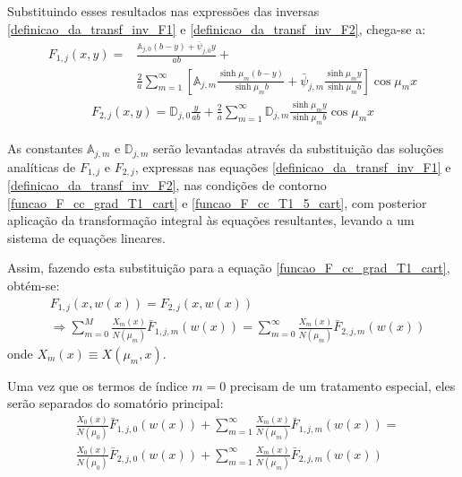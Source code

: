 Substituindo esses resultados
nas expressões das inversas \eqref{definicao_da_transf_inv_F1} e \eqref{definicao_da_transf_inv_F2}, chega-se a:
\begin{align}
F_{1, j}(x, y) = & \frac{\mathbb{A}_{j,0}(b - y) + \bar{\psi}_{j,0}y}{ab} + \nonumber \\
&\frac{2}{a}\sum_{m=1}^\infty\left[\mathbb{A}_{j,m}\frac{\sinh\mu_m (b - y)}{\sinh\mu_m b} + \bar{\psi}_{j, m}\frac{\sinh\mu_m y}{\sinh\mu_m b}\right]\cos\mu_m x
\label{solucao_transf_inversa_F1_com_dependencia}
\end{align}
\begin{align}
F_{2, j}(x, y) = \mathbb{D}_{j,0}\frac{y}{ab}  + \frac{2}{a}\sum_{m=1}^\infty\mathbb{D}_{j,m}\frac{\sinh\mu_m y}{\sinh\mu_m b} \cos\mu_m x
\label{solucao_transf_inversa_F2_com_dependencia}
\end{align}

As constantes $\mathbb{A}_{j,m}$ e $\mathbb{D}_{j,m}$ serão levantadas através da substituição das soluções analíticas de $F_{1,j}$ e $F_{2,j}$, expressas nas equações \eqref{definicao_da_transf_inv_F1} e
\eqref{definicao_da_transf_inv_F2}, nas condições de contorno \eqref{funcao_F_cc_grad_T1_cart} e \eqref{funcao_F_cc_T1_5_cart}, com posterior aplicação da transformação integral às equações resultantes, levando a um sistema de equações lineares.

Assim, fazendo esta
substituição para a equação \eqref{funcao_F_cc_grad_T1_cart}, obtém-se:
\begin{align}
	& F_{1,j}(x, w(x)) = F_{2, j}(x, w(x)) \nonumber \\
	& \Rightarrow \sum_{m=0}^M \frac{X_m(x)}{N(\mu_m)}\bar{F}_{1,j,m}(w(x)) = \sum_{m=0}^\infty \frac{X_m(x)}{N(\mu_m)}\bar{F}_{2,j,m}(w(x))
\end{align}
onde $X_m(x) \equiv X(\mu_m, x)$.

Uma vez que os termos de índice $m = 0$ precisam de um tratamento especial, eles serão separados do somatório principal:
\begin{align}
& \frac{X_0(x)}{N(\mu_0)}\bar{F}_{1,j,0}(w(x)) +
\sum_{m=1}^\infty \frac{X_m(x)}{N(\mu_m)}\bar{F}_{1,j,m}(w(x))
= \nonumber \\
& \frac{X_0(x)}{N(\mu_0)}\bar{F}_{2,j,0}(w(x)) +
\sum_{m=1}^\infty \frac{X_m(x)}{N(\mu_m)}\bar{F}_{2,j,m}(w(x))
\end{align}

